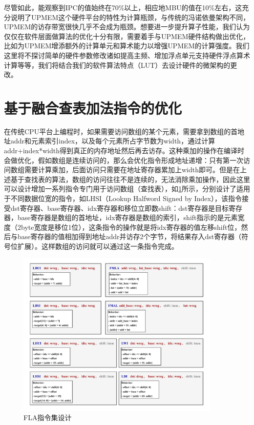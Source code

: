 尽管如此，能观察到IPC的值始终在70\%以上，相应地MBU的值在10\%左右，这充分说明了UPMEM这个硬件平台的特性为计算瓶颈，与传统的冯诺依曼架构不同，UPMEM的访存带宽很快几乎不会成为瓶颈。想要进一步提升算子性能，我们认为仅仅在软件层面做算法的优化十分有限，需要着手与UPMEM硬件结构做出优化，比如为UPMEM增添额外的计算单元和算术能力以增强UPMEM的计算强度。我们这里将不探讨简单的硬件参数修改诸如提高主频、增加浮点单元支持硬件浮点算术计算等等，我们将结合我们的软件算法特点（LUT）去设计硬件的微架构的更改。

\section{基于融合查表加法指令的优化}
在传统CPU平台上编程时，如果需要访问数组的某个元素，需要拿到数组的首地址addr和元素索引index，以及每个元素所占字节数为width，通过计算addr+index*width得到真正的内存地址然后再去访存。这种乘加的操作在编译时会做优化，假如数组是连续访问的，那么会优化指令形成地址递增：只有第一次访问数组需要计算乘加，后面访问只需要在地址寄存器累加上width即可。但是在上述基于查找表的算法，数组的访问往往不是连续的，无法消除乘加操作，因此这里可以设计增加一系列指令专门用于访问数组（查找表），如\ref{LUTInst}所示，分别设计了适用于不同数据位宽的指令，如LHSI（Lookup Halfword Signed by Index），该指令接受dst寄存器、base寄存器、idx寄存器和移位立即数shift：dst寄存器是目标寄存器，base寄存器是数组的首地址，idx寄存器是数组的索引，shift指示的是元素宽度（2byte宽度是移位1位），这条指令的操作就是将idx寄存器的值左移shift位，然后与base寄存器的值相加得到地址addr并访存2个字节，将结果存入dst寄存器（符号位扩展）。这样数组的访问就可以通过这一条指令完成。

\begin{figure}[!htbp]
	\centering
    \includegraphics[width=0.9\textwidth]{figures/LUTInst.pdf}
	\caption{FLA指令集设计}
    \label{LUTInst}
\end{figure}

